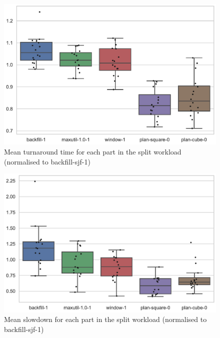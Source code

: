 \documentclass[thesis-en.tex]{subfiles}
\begin{document}
\begin{figure}[p]
    \centering
    \includegraphics[width=\textwidth]{best_alloc-only_parts_turnaround-time_box.pdf}
    \caption{Mean turnaround time for each part in the split workload (normalised to backfill-sjf-1)}
    \label{fig:best_alloc-only_parts_turnaround-time_box}
\end{figure}

\begin{figure}[p]
    \centering
    \includegraphics[width=\textwidth]{best_alloc-only_parts_slowdown_box.pdf}
    \caption{Mean slowdown for each part in the split workload (normalised to backfill-sjf-1)}
    \label{fig:best_alloc-only_parts_slowdown_box}
\end{figure}
\end{document}
